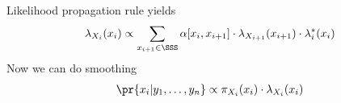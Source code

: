 \documentclass[landscape,footrule]{foils}
\begin{document}
\enlargethispage{1cm}

\vspace*{-1.0cm}

Likelihood propagation rule yields
\begin{align*}
\lambda_{X_i}(x_i)\propto \sum_{x_{i+1}\in \SSS} \alpha[x_{i}, x_{i+1}]\cdot\lambda_{X_{i+1}}(x_{i+1})\cdot \lambda_{i}^*(x_{i})
\end{align*}
Now we can do smoothing 
\begin{align*}
\pr{x_i|y_1,\ldots,y_{n}}\propto \pi_{X_i}(x_i)\cdot\lambda_{X_i}(x_i)
\end{align*}



\end{document}
